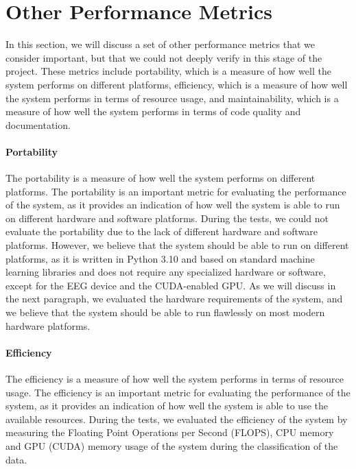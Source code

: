 \section{Other Performance Metrics}
In this section, we will discuss a set of other performance metrics that we consider important, but that we could not deeply verify in this stage of the project.
These metrics include portability, which is a measure of how well the system performs on different platforms, efficiency, which is a measure of how well the system performs in terms of resource usage, and maintainability, which is a measure of how well the system performs in terms of code quality and documentation.

\paragraph{Portability}
The portability is a measure of how well the system performs on different platforms.
The portability is an important metric for evaluating the performance of the system, as it provides an indication of how well the system is able to run on different hardware and software platforms.
During the tests, we could not evaluate the portability due to the lack of different hardware and software platforms.
However, we believe that the system should be able to run on different platforms, as it is written in Python 3.10 and based on standard machine learning libraries and does not require any specialized hardware or software, except for the EEG device and the CUDA-enabled GPU.
As we will discuss in the next paragraph, we evaluated the hardware requirements of the system, and we believe that the system should be able to run flawlessly on most modern hardware platforms.

\paragraph{Efficiency}
The efficiency is a measure of how well the system performs in terms of resource usage.
The efficiency is an important metric for evaluating the performance of the system, as it provides an indication of how well the system is able to use the available resources.
During the tests, we evaluated the efficiency of the system by measuring the Floating Point Operations per Second (FLOPS), CPU memory and GPU (CUDA) memory usage of the system during the classification of the data.

